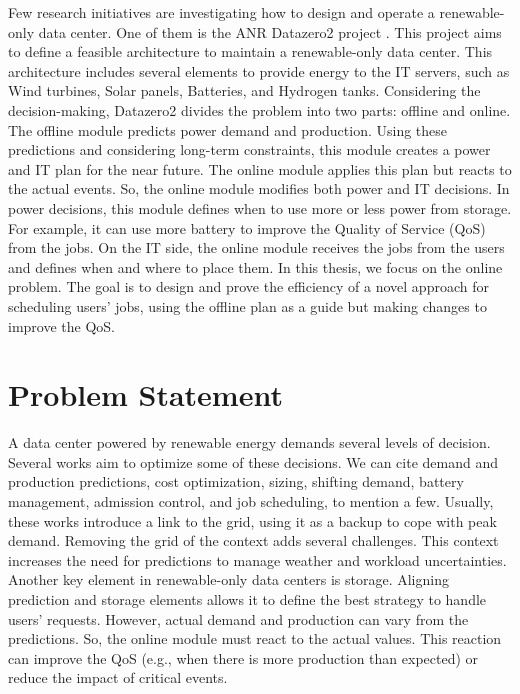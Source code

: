 Few research initiatives are investigating how to design and operate a renewable-only data center. One of them is the ANR Datazero2 project \cite{Datazero}. This project aims to define a feasible architecture to maintain a renewable-only data center. This architecture includes several elements to provide energy to the IT servers, such as Wind turbines, Solar panels, Batteries, and Hydrogen tanks. Considering the decision-making, Datazero2 divides the problem into two parts: offline and online. The offline module predicts power demand and production. Using these predictions and considering long-term constraints, this module creates a power and IT plan for the near future. The online module applies this plan but reacts to the actual events. So, the online module modifies both power and IT decisions. In power decisions, this module defines when to use more or less power from storage. For example, it can use more battery to improve the Quality of Service (QoS) from the jobs. On the IT side, the online module receives the jobs from the users and defines when and where to place them. In this thesis, we focus on the online problem. The goal is to design and prove the efficiency of a novel approach for scheduling users' jobs, using the offline plan as a guide but making changes to improve the QoS.

\section{Problem Statement}

A data center powered by renewable energy demands several levels of decision. Several works aim to optimize some of these decisions. We can cite demand and production predictions, cost optimization, sizing, shifting demand, battery management, admission control, and job scheduling, to mention a few. Usually, these works introduce a link to the grid, using it as a backup to cope with peak demand. Removing the grid of the context adds several challenges. This context increases the need for predictions to manage weather and workload uncertainties. Another key element in renewable-only data centers is storage. Aligning prediction and storage elements allows it to define the best strategy to handle users' requests. However, actual demand and production can vary from the predictions. So, the online module must react to the actual values. This reaction can improve the QoS (e.g., when there is more production than expected) or reduce the impact of critical events.

